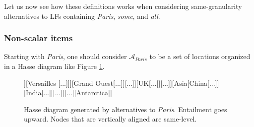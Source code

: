 	\begin{exe}
		\ex \label{ex:same-gran-alt-unpacking}
		\begin{xlist}
		\end{xlist}
	\end{exe}
	
	
	Let us now see how these definitions works when considering same-granularity alternatives to LFs containing \textit{Paris}, \textit{some}, and \textit{all}.
	
	\subsubsection{Non-scalar items}
	Starting with \textit{Paris}, one should consider $\mathcal{A}_{\textit{Paris}}$ to be a set of locations organized in a Hasse diagram like Figure \ref{fig:paris-hasse}.
	
		\begin{figure}[H]
		\centering
		\begin{forest}
			[World[Europe[France[Île-de-France[Paris [Ier][...][XXème]][Versailles [...]]][Grand Ouest[...]][...]][UK[...]][...]][Asia[China[...]][India[...]][...]][...][Antarctica]]
		\end{forest}
		\caption{Hasse diagram generated by alternatives to \textit{Paris}. Entailment goes upward. Nodes that are vertically aligned are same-level.}
		\label{fig:paris-hasse}
	\end{figure}
	
